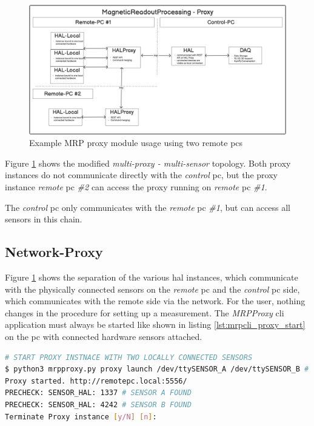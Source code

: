 \begin{figure}
\centering
\includegraphics{./generated_images/border_Example_MRP_proxy_module_usage_using_two_remote_(+pc)s.png}
\caption{Example MRP proxy module usage using two remote \gls{pc}s
\label{Example_MRP_proxy_module_usage_using_two_remote_(+pc)s.png}}
\end{figure}

Figure \ref{Example_MRP_proxy_module_usage_using_two_remote_(+pc)s.png}
shows the modified \emph{multi-proxy - multi-sensor} topology. Both
proxy instances do not communicate directly with the \emph{control}
\gls{pc}, but the proxy instance \emph{remote} \gls{pc} \emph{\#2} can
access the proxy running on \emph{remote} \gls{pc} \emph{\#1}.

The \emph{control} \gls{pc} only communicates with the \emph{remote}
\gls{pc} \emph{\#1}, but can access all sensors in this chain.

\hypertarget{network-proxy}{%
\subsection{Network-Proxy}\label{network-proxy}}

Figure \ref{Example_MRP_proxy_module_usage_using_two_remote_(+pc)s.png}
shows the separation of the various \gls{hal} instances, which
communicate with the physically connected sensors on the \emph{remote}
\gls{pc} and the \emph{control} \gls{pc} side, which communicates with
the remote side via the network. For the user, nothing changes in the
procedure for setting up a measurement. The \emph{MRPProxy} \gls{cli}
application must always be started like shown in listing
\ref{lst:mrpcli_proxy_start} on the \gls{pc} with connected hardware
sensors attached.

\begin{lstlisting}[language=bash, caption={MRPProxy usage to enable local sensor forwarding over the network. The CLI output shows the available sensor to the connected host PC}, label=lst:mrpcli_proxy_start]
# START PROXY INSTNACE WITH TWO LOCALLY CONNECTED SENSORS
$ python3 mrpproxy.py proxy launch /dev/ttySENSOR_A /dev/ttySENSOR_B # add another proxy instance http://proxyinstance_2.local for multi-sensor, multi-proxy chain
Proxy started. http://remotepc.local:5556/
PRECHECK: SENSOR_HAL: 1337 # SENSOR A FOUND
PRECHECK: SENSOR_HAL: 4242 # SENSOR B FOUND
Terminate Proxy instance [y/N] [n]: 
\end{lstlisting}

